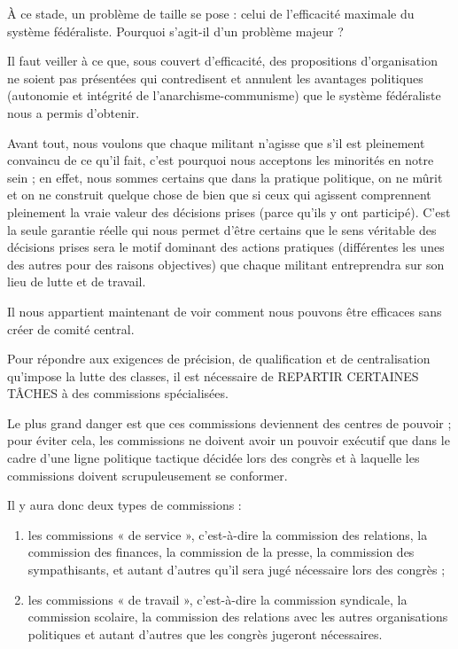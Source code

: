 À ce stade, un problème de taille se pose : celui de l'efficacité maximale du système fédéraliste. Pourquoi s'agit-il d'un problème majeur ?

Il faut veiller à ce que, sous couvert d'efficacité, des propositions d'organisation ne soient pas présentées qui contredisent et annulent les avantages politiques (autonomie et intégrité de l'anarchisme-communisme) que le système fédéraliste nous a permis d'obtenir.

Avant tout, nous voulons que chaque militant n'agisse que s'il est pleinement convaincu de ce qu'il fait, c'est pourquoi nous acceptons les minorités en notre sein ; en effet, nous sommes certains que dans la pratique politique, on ne mûrit et on ne construit quelque chose de bien que si ceux qui agissent comprennent pleinement la vraie valeur des décisions prises (parce qu'ils y ont participé). C'est la seule garantie réelle qui nous permet d'être certains que le sens véritable des décisions prises sera le motif dominant des actions pratiques (différentes les unes des autres pour des raisons objectives) que chaque militant entreprendra sur son lieu de lutte et de travail.

Il nous appartient maintenant de voir comment nous pouvons être efficaces sans créer de comité central.

Pour répondre aux exigences de précision, de qualification et de centralisation qu'impose la lutte des classes, il est nécessaire de REPARTIR CERTAINES TÂCHES à des commissions spécialisées.

Le plus grand danger est que ces commissions deviennent des centres de pouvoir ; pour éviter cela, les commissions ne doivent avoir un pouvoir exécutif que dans le cadre d'une ligne politique tactique décidée lors des congrès et à laquelle les commissions doivent scrupuleusement se conformer.

Il y aura donc deux types de commissions :

\begin{enumerate}
\item{} les commissions « de service », c'est-à-dire la commission des relations, la commission des finances, la commission de la presse, la commission des sympathisants, et autant d'autres qu'il sera jugé nécessaire lors des congrès ;
\item{} les commissions « de travail », c'est-à-dire la commission syndicale, la commission scolaire, la commission des relations avec les autres organisations politiques et autant d'autres que les congrès jugeront nécessaires.
\end{enumerate}

